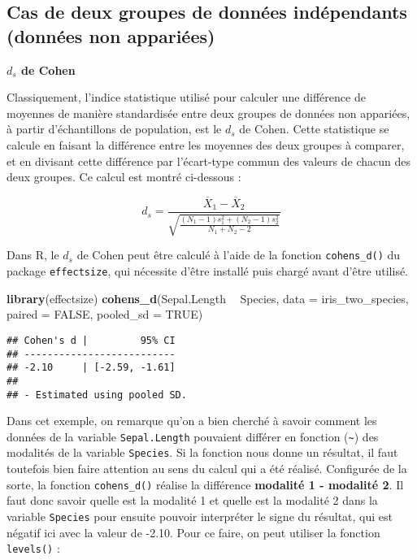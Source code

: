 \documentclass[
  french,
]{book}
\newenvironment{Shaded}{\begin{snugshade}}{\end{snugshade}}
\newcommand{\DataTypeTok}[1]{\textcolor[rgb]{0.13,0.29,0.53}{#1}}
\newcommand{\KeywordTok}[1]{\textcolor[rgb]{0.13,0.29,0.53}{\textbf{#1}}}
\newcommand{\NormalTok}[1]{#1}
\newcommand{\OperatorTok}[1]{\textcolor[rgb]{0.81,0.36,0.00}{\textbf{#1}}}
\newcommand{\OtherTok}[1]{\textcolor[rgb]{0.56,0.35,0.01}{#1}}
\newcommand{\StringTok}[1]{\textcolor[rgb]{0.31,0.60,0.02}{#1}}
\begin{document}
\hypertarget{cas-de-deux-groupes-de-donnuxe9es-induxe9pendants-donnuxe9es-non-appariuxe9es}{%
\subsection{Cas de deux groupes de données indépendants (données non appariées)}\label{cas-de-deux-groupes-de-donnuxe9es-induxe9pendants-donnuxe9es-non-appariuxe9es}}

\textbf{\(d_{s}\) de Cohen}

Classiquement, l'indice statistique utilisé pour calculer une différence de moyennes de manière standardisée entre deux groupes de données non appariées, à partir d'échantillons de population, est le \(d_{s}\) de Cohen. Cette statistique se calcule en faisant la différence entre les moyennes des deux groupes à comparer, et en divisant cette différence par l'écart-type commun des valeurs de chacun des deux groupes. Ce calcul est montré ci-dessous :

\[d_{s} = \frac{\overline{X}_{1} - \overline{X}_{2}} {\sqrt{\frac{(N_{1} - 1) s_{1}^2 + (N_{2} - 1) s_{2}^2} {N_{1} + N_{2} - 2}}}\]

Dans R, le \(d_{s}\) de Cohen peut être calculé à l'aide de la fonction \texttt{cohens\_d()} du package \texttt{effectsize}, qui nécessite d'être installé puis chargé avant d'être utilisé.

\begin{Shaded}
\begin{Highlighting}[]
\KeywordTok{library}\NormalTok{(effectsize)}
\KeywordTok{cohens_d}\NormalTok{(Sepal.Length }\OperatorTok{~}\StringTok{ }\NormalTok{Species, }
         \DataTypeTok{data =}\NormalTok{ iris_two_species, }
         \DataTypeTok{paired =} \OtherTok{FALSE}\NormalTok{, }
         \DataTypeTok{pooled_sd =} \OtherTok{TRUE}\NormalTok{)}
\end{Highlighting}
\end{Shaded}

\begin{verbatim}
## Cohen's d |         95% CI
## --------------------------
## -2.10     | [-2.59, -1.61]
## 
## - Estimated using pooled SD.
\end{verbatim}

Dans cet exemple, on remarque qu'on a bien cherché à savoir comment les données de la variable \texttt{Sepal.Length} pouvaient différer en fonction (\texttt{\textasciitilde{}}) des modalités de la variable \texttt{Species}. Si la fonction nous donne un résultat, il faut toutefois bien faire attention au sens du calcul qui a été réalisé. Configurée de la sorte, la fonction \texttt{cohens\_d()} réalise la différence \textbf{modalité 1 - modalité 2}. Il faut donc savoir quelle est la modalité 1 et quelle est la modalité 2 dans la variable \texttt{Species} pour ensuite pouvoir interpréter le signe du résultat, qui est négatif ici avec la valeur de -2.10. Pour ce faire, on peut utiliser la fonction \texttt{levels()} :
\end{document}
